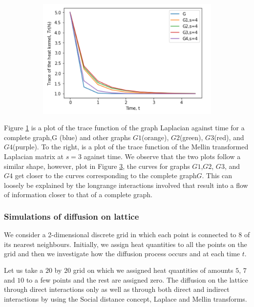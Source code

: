 \documentclass[10pt,a4paper]{article}
\begin{document}
\begin{figure}[H]
\begin{subfigure}[b]{0.45\textwidth}
  	    	\caption{}
  	    	\label{completeL1}
  	    \end{subfigure}~
  	    \begin{subfigure}[b]{0.45\textwidth}
  	    	\includegraphics[width= \textwidth]{images/s4-graphcomp.png}
  	    	\caption{}
  	    	\label{completeMellins3}
  	    \end{subfigure}
  	\end{figure}
      Figure \ref{completeL1} is a plot of the trace function of the graph Laplacian against time for a complete graph,G (blue) and other graphs $G1$(orange), $G2$(green), $G3$(red), and $G4$(purple). To the right, is a plot of the trace function of the Mellin transformed Laplacian matrix at $s=3$ against time. We observe that the two plots follow a similar shape, however, plot in Figure \ref{completeMellins3}, the curves for graphs $G1$,$G2$, $G3$, and $G4$ get closer to the curves corresponding to the complete graph$G$. This can loosely be explained by the longrange interactions involved that result into a flow of information closer to that of a complete graph.
  
	  
        \subsubsection{Simulations of diffusion on lattice}
         We consider a 2-dimensional discrete grid in which each point is connected to 8 of its nearest neighbours. Initially, we assign heat quantities to all the points on the grid and then we investigate how the diffusion process occurs and at each time $t$. 
   
         Let us take a $20$ by $20$ grid on which we assigned heat quantities of amounts $5$, $7$ and $10$ to a few points and the rest are assigned zero. The diffusion on the lattice through direct interactions only as well as through both direct and indirect interactions by using the Social distance concept, Laplace and Mellin transforms.
         
\end{document}

